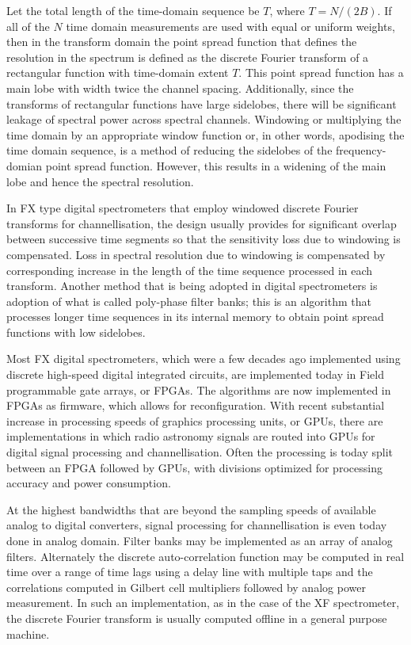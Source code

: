   Let the total length of the time-domain sequence be $T$, where $T = N/(2B)$.  If all of the $N$ time domain measurements are used with equal or uniform weights, then in the transform domain the point spread function that defines the resolution in the spectrum is defined as the discrete Fourier transform of a rectangular function with time-domain extent $T$.  This point spread function has a main lobe with width twice the channel spacing.  Additionally, since the transforms of rectangular functions have large sidelobes, there will be significant leakage of spectral power across spectral channels. Windowing or multiplying the time domain by an appropriate window function or, in other words, apodising the time domain sequence, is a method of reducing the sidelobes of the frequency-domian point spread function.  However, this results in a widening of the main lobe and hence the spectral resolution.  
  
  In FX type digital spectrometers that employ windowed discrete Fourier transforms for channellisation, the design usually provides for significant overlap between successive time segments so that the sensitivity loss due to windowing is compensated.  Loss in spectral resolution due to windowing is compensated by corresponding increase in the length of the time sequence processed in each transform.  Another method that is being adopted in digital spectrometers is adoption of what is called poly-phase filter banks; this is an algorithm that processes longer time sequences in its internal memory to obtain point spread functions with low sidelobes.
  
  Most FX digital spectrometers, which were a few decades ago implemented using discrete high-speed digital integrated circuits, are implemented today in Field programmable gate arrays, or FPGAs.  The algorithms are now implemented in FPGAs as firmware, which allows for reconfiguration.  With recent substantial increase in processing speeds of graphics processing units, or GPUs, there are implementations in which radio astronomy signals are routed into GPUs for digital signal processing and channellisation.  Often the processing is today split between an FPGA followed by GPUs, with divisions optimized for processing accuracy and power consumption.  
  
  At the highest bandwidths that are beyond the sampling speeds of available analog to digital converters, signal processing for channellisation is even today done in analog domain.  Filter banks may be implemented as an array of analog filters.  Alternately the discrete auto-correlation function may be computed in real time over a range of time lags using a delay line with multiple taps and the correlations computed in Gilbert cell multipliers followed by analog power measurement.  In such an implementation, as in the case of the XF spectrometer, the discrete Fourier transform is usually computed offline in a general purpose machine.

